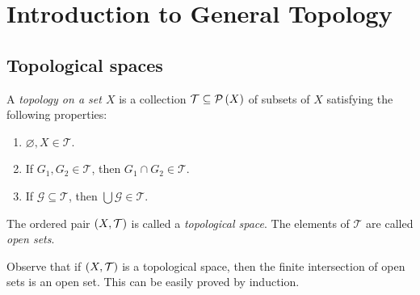 \chapter{Introduction to General Topology}

\section{Topological spaces}

\begin{definition}
  A \emph{topology on a set $X$ }is a collection $\mathcal{T}\subseteq\mathcal{P}\left(X\right)$ of subsets of $X$ satisfying the following properties:

  \begin{enumerate}
      \item $\varnothing,X\in\mathcal{T}$.
      \item If $G_1,G_2\in\mathcal{T}$, then $G_1\cap G_2\in\mathcal{T}$.
      \item If $\mathcal{G}\subseteq\mathcal{T}$, then $\bigcup{\mathcal{G}}\in\mathcal{T}$.
  \end{enumerate}

  The ordered pair $\left(X,\mathcal{T}\right)$ is called a \emph{topological space}. The elements of $\mathcal{T}$ are called \emph{open sets}.
\end{definition}

\begin{remark}
  Observe that if $\left(X,\mathcal{T}\right)$ is a topological space, then the finite intersection of open sets is an open set. This can be easily proved by induction.
\end{remark}

